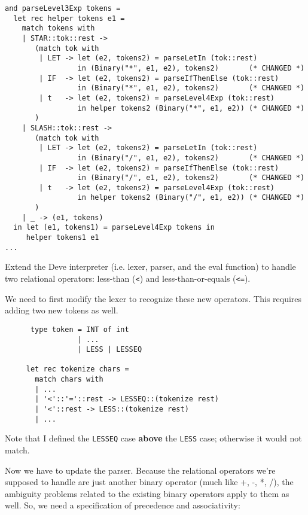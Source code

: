 \documentclass[addpoints]{exam}
\begin{document}
\begin{questions}
\begin{solution}
{\begin{verbatim}
and parseLevel3Exp tokens =
  let rec helper tokens e1 =
    match tokens with
    | STAR::tok::rest ->
       (match tok with
        | LET -> let (e2, tokens2) = parseLetIn (tok::rest)
                 in (Binary("*", e1, e2), tokens2)       (* CHANGED *)
        | IF  -> let (e2, tokens2) = parseIfThenElse (tok::rest)
                 in (Binary("*", e1, e2), tokens2)       (* CHANGED *)
        | t   -> let (e2, tokens2) = parseLevel4Exp (tok::rest)
                 in helper tokens2 (Binary("*", e1, e2)) (* CHANGED *)
       )
    | SLASH::tok::rest ->
       (match tok with
        | LET -> let (e2, tokens2) = parseLetIn (tok::rest)
                 in (Binary("/", e1, e2), tokens2)       (* CHANGED *)
        | IF  -> let (e2, tokens2) = parseIfThenElse (tok::rest)
                 in (Binary("/", e1, e2), tokens2)       (* CHANGED *)
        | t   -> let (e2, tokens2) = parseLevel4Exp (tok::rest)
                 in helper tokens2 (Binary("/", e1, e2)) (* CHANGED *)
       )
    | _ -> (e1, tokens)
  in let (e1, tokens1) = parseLevel4Exp tokens in
     helper tokens1 e1
...
    \end{verbatim}
    }
  \end{solution}
  
  \question
  Extend the Deve interpreter (i.e. lexer, parser, and the
  eval function) to handle two relational operators:
  less-than (\texttt{<}) and less-than-or-equals
  (\texttt{<=}).

  \begin{solution}
    We need to first modify the lexer to recognize
    these new operators. This requires adding
    two new tokens as well.
    
    \begin{verbatim}
      type token = INT of int
                 | ...
                 | LESS | LESSEQ

     let rec tokenize chars =
       match chars with
       | ...
       | '<'::'='::rest -> LESSEQ::(tokenize rest)
       | '<'::rest -> LESS::(tokenize rest)
       | ...
    \end{verbatim}

    Note that I defined the \texttt{LESSEQ} case
    \textbf{above} the \texttt{LESS} case;
    otherwise it would not match.
    
    Now we have to update the parser. Because the relational operators we're supposed to
    handle are just another binary operator (much like +, -, *, /),
    the ambiguity problems related to the existing binary operators apply to them as well.
    So, we need a specification of precedence and associativity:


\end{solution}
\end{questions}
\end{document}
